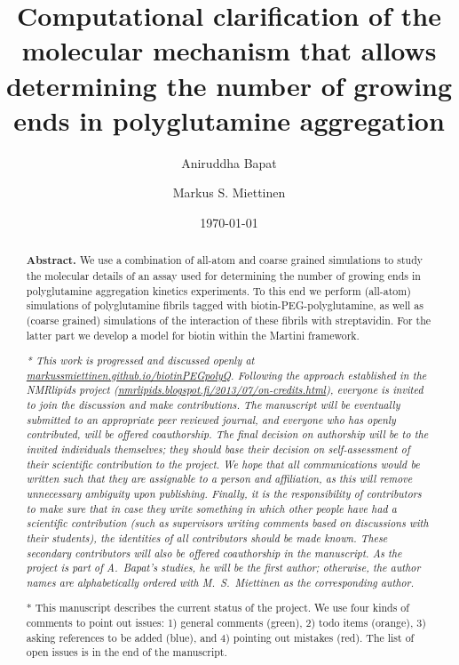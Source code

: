 \documentclass[a4paper,11pt,floatfix,authordate1-4,twocolumn]{revtex4-1}
\newcommand{\comment}[3][]
{\todo[color=green!40,#1]{{\sffamily #3:} #2}} %
\newcommand{\task}[3][]
{\todo[color=orange!60,#1]{{\sffamily #3:} #2}} %
\newcommand{\reference}[3][]
{\todo[color=blue!40,#1]{{\sffamily #3:} #2}} %
\newcommand{\wrong}[3][]
{\todo[color=red!70,#1]{{\sffamily #3:} #2}} %
\begin{document}
\title{Computational clarification of the molecular mechanism that allows\\
 determining the number of growing ends in polyglutamine aggregation}

\author{Aniruddha Bapat}
\author{Markus S. Miettinen}

\date{\today}

\begin{abstract}
{\bf Abstract.}
We use a combination of all-atom and coarse grained simulations
to study the molecular details of an assay used for
determining the number of growing ends in polyglutamine
aggregation kinetics experiments.
%
To this end we perform (all-atom) simulations of
polyglutamine fibrils tagged with biotin-PEG-polyglutamine,
as well as (coarse grained) simulations of
the interaction of these fibrils with streptavidin.
%
For the latter part we develop a model for biotin
within the Martini framework.


\vspace{14pt}
{\it
* This work is progressed and discussed openly at \url{markussmiettinen.github.io/biotinPEGpolyQ}.
Following the approach established in the NMRlipids project
(\url{nmrlipids.blogspot.fi/2013/07/on-credits.html}),
everyone is invited to join the discussion and make contributions.
The manuscript will be eventually submitted to an appropriate peer reviewed journal, and
everyone who has openly contributed, will be offered coauthorship.
The final decision on authorship will be to the invited individuals themselves;
they should base their decision on self-assessment of their scientific contribution to the project.
%
We hope that all communications would be written such that they are assignable
to a person and affiliation, as this will remove unnecessary ambiguity upon publishing.
%
Finally, it is the responsibility of contributors to make sure that in case they write something in which other people have had a scientific contribution (such as supervisors writing comments based on discussions with their students), the identities of all contributors should be made known. These secondary contributors will also be offered coauthorship in the manuscript.
%
As the project is part of A.~Bapat's studies, he will be the first author;
otherwise, the author names are alphabetically ordered with M.~S.~Miettinen as the corresponding author.

* This manuscript describes the current status of the project.
%
We use four kinds of comments to point out issues:
1) general comments \comment{I think\ldots}{Name} (green),
2) todo items \task{Do this!}{Name} (orange),
3) asking references to be added \reference{Add ref!}{Name} (blue), and
4) pointing out mistakes \wrong{Wrong!}{Name} (red).
%
The list of open issues is in the end of the manuscript.
}
\end{abstract}
\end{document}
